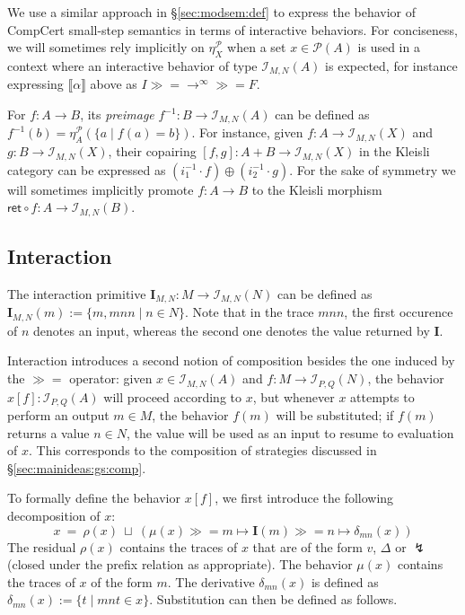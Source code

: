 \documentclass[acmsmall,timestamp,review,anonymous]{acmart}
\newcommand{\kw}[1]{\ensuremath{ \mathsf{#1} }}
\newcommand{\bind}{\gg\!\!=}
\begin{document}
We use a similar approach in \S\ref{sec:modsem:def}
to express the behavior of CompCert small-step semantics
in terms of interactive behaviors.
For conciseness,
we will sometimes rely implicitly on $\eta_X^\mathcal{P}$
when a set $x \in \mathcal{P}(A)$ is used
in a context where an interactive behavior
of type $\mathcal{I}_{M,N}(A)$ is expected,
for instance expressing $\llbracket \alpha \rrbracket$ above as
$I \bind {\rightarrow}^\infty \bind F$.

For $f : A \rightarrow B$,
its \emph{preimage}
$f^{-1} : B \rightarrow \mathcal{I}_{M,N}(A)$
can be defined as
$f^{-1}(b) = \eta^\mathcal{P}_A(\{ a \mid f(a) = b \})$.
For instance, given
$f : A \rightarrow \mathcal{I}_{M,N}(X)$ and
$g : B \rightarrow \mathcal{I}_{M,N}(X)$,
their copairing $[f, g] : A + B \rightarrow \mathcal{I}_{M,N}(X)$
in the Kleisli category can be expressed as
$(i_1^{-1} \cdot f) \oplus (i_2^{-1} \cdot g)$.
For the sake of symmetry we will sometimes implicitly promote
$f : A \rightarrow B$ to the Kleisli morphism
$\kw{ret} \circ f : A \rightarrow \mathcal{I}_{M,N}(B)$.


\subsection{Interaction} \label{sec:monad:int} %

The interaction primitive
$\mathbf{I}_{M,N} : M \rightarrow \mathcal{I}_{M,N}(N)$
can be defined as
$
    \mathbf{I}_{M,N}(m) := \{ m, mnn \mid n \in N \}
$.
Note that in the trace $mnn$,
the first occurence of $n$ denotes an input,
whereas the second one denotes the value returned by $\mathbf{I}$.

Interaction introduces a second notion of composition
besides the one induced by the $\bind$ operator:
given
$x \in \mathcal{I}_{M,N}(A)$ and
$f : M \rightarrow \mathcal{I}_{P,Q}(N)$,
the behavior $x[f] : \mathcal{I}_{P,Q}(A)$
will proceed according to $x$,
but whenever $x$ attempts to perform an output $m \in M$,
the behavior $f(m)$ will be substituted;
if $f(m)$ returns a value $n \in N$,
the value will be used as an input to resume to evaluation of $x$.
This corresponds to the composition of strategies
discussed in \S\ref{sec:mainideas:gs:comp}.

To formally define the behavior $x[f]$,
we first introduce the following decomposition of $x$:
\[
    x \: = \: \rho(x) \: \sqcup \:
        (\mu(x) \bind m \mapsto \mathbf{I}(m) \bind n \mapsto \delta_{mn}(x))
\]
The residual $\rho(x)$
contains the traces of $x$ that are of the form $v$, $\Delta$ or $\lightning$
(closed under the prefix relation as appropriate).
The behavior $\mu(x)$ contains the traces of $x$ of the form $m$.
The derivative $\delta_{mn}(x)$ is defined as
$\delta_{mn}(x) := \{ t \mid mnt \in x \}$.
Substitution can then be defined as follows.
\end{document}
